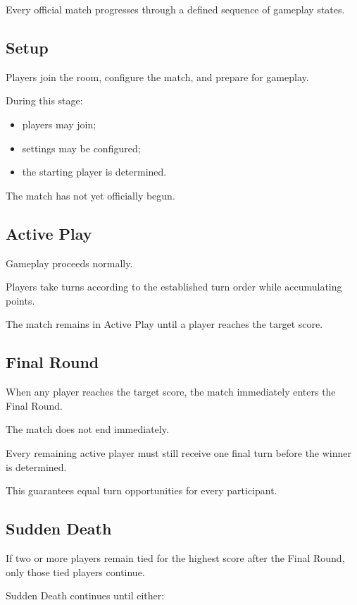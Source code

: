 \documentclass[11pt,a4paper]{article}
\begin{document}
Every official match progresses through a defined sequence of gameplay states.

\subsection{Setup}

Players join the room, configure the match, and prepare for gameplay.

During this stage:

\begin{itemize}
    \item players may join;
    \item settings may be configured;
    \item the starting player is determined.
\end{itemize}

The match has not yet officially begun.

\subsection{Active Play}

Gameplay proceeds normally.

Players take turns according to the established turn order while accumulating points.

The match remains in Active Play until a player reaches the target score.

\subsection{Final Round}

When any player reaches the target score, the match immediately enters the Final Round.

The match does not end immediately.

Every remaining active player must still receive one final turn before the winner is determined.

This guarantees equal turn opportunities for every participant.

\subsection{Sudden Death}

If two or more players remain tied for the highest score after the Final Round, only those tied players continue.

Sudden Death continues until either:
\end{document}
